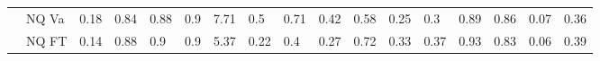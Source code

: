 \begin{table*}[t]
{\begin{tabular}{@{}ll|llll|llll|lll|ll|ll@{}}
                           & NQ Va                & 0.18                                                                    & 0.84                                                                     & 0.88                                                                  & 0.9                                                                   & 7.71                                                                    & 0.5                                                                   & 0.71                                                                  & 0.42                                                                   & 0.58                                                                    & 0.25                                                                  & 0.3                                                                    & 0.89                                                                   & 0.86                                                                   & 0.07                                                                     & 0.36                                                                     \\
                           & NQ FT                & 0.14                                                                    & 0.88                                                                     & 0.9                                                                   & 0.9                                                                   & 5.37                                                                    & 0.22                                                                  & 0.4                                                                   & 0.27                                                                   & 0.72                                                                    & 0.33                                                                  & 0.37                                                                   & 0.93                                                                   & 0.83                                                                   & 0.06                                                                     & 0.39                                                                     \\

\end{tabular}}
\end{table*}
